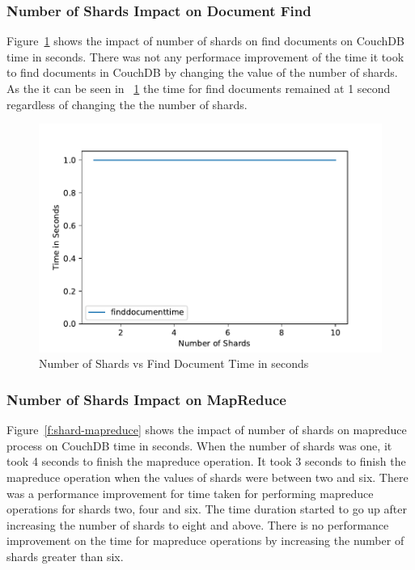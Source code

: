 \subsubsection{Number of Shards Impact on Document Find}


Figure~\ref{f:shard-find} shows the impact of number of shards on find
documents on CouchDB time in seconds. There was not any performace
improvement of the time it took to find documents in CouchDB  by
changing the value of the number of shards. As the it can be seen in
~\ref{f:shard-find} the time for find documents remained at 1 second
regardless of changing the the number of shards.

\begin{figure}[!ht]
  \centering\includegraphics[width=\columnwidth]{../images/ShardsFindDoc.pdf}
  \caption{Number of Shards vs Find Document Time in seconds }\label{f:shard-find}
\end{figure}

\subsubsection{Number of Shards Impact on MapReduce}


Figure~\ref{f:shard-mapreduce} shows the impact of number of shards on
mapreduce process on CouchDB time in seconds. When the number of
shards was one, it took 4 seconds to finish the mapreduce
operation. It took 3 seconds to finish the mapreduce operation when
the values of shards were between two and six. There was a performance
improvement for time taken for performing mapreduce operations for
shards two, four and six.  The time duration started to go up after
increasing the number of shards to eight and above. There is no
performance improvement on the time for mapreduce operations by
increasing the number of shards greater than six.

